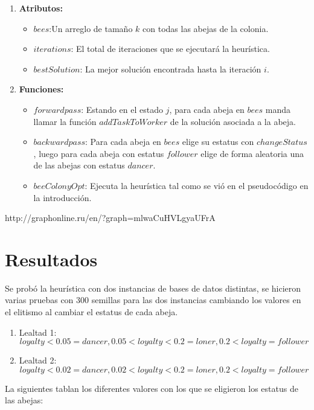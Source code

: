 \documentclass[12pt]{article}
\begin{document}
	\begin{enumerate}
		\item \textbf{Atributos:}
		\begin{itemize}
			\item $bees$:Un arreglo de tamaño $k$ con todas las abejas de la colonia.
			\item $iterations$: El total de iteraciones que se ejecutará la heurística.
			\item $bestSolution$: La mejor solución encontrada hasta la iteración $i$.
		\end{itemize}
		\item \textbf{Funciones:}
		\begin{itemize}
			\item $forwardpass$: Estando en el estado $j$, para cada abeja en $bees$ 
			manda llamar la función $addTaskToWorker$ de la solución asociada a la 
			abeja.
			\item $backwardpass$: Para cada abeja en $bees$ elige su estatus con 
			$changeStatus$, luego para cada abeja con estatus $follower$ elige de 
			forma aleatoria una de las abejas con estatus $dancer$.
			\item $beeColonyOpt$: Ejecuta la heurística tal como se vió en el 
			pseudocódigo en la introducción.  
		\end{itemize}
	\end{enumerate}

	http://graphonline.ru/en/?graph=mlwaCuHVLgyaUFrA
	
	\section{Resultados}
	
	Se probó la heurística con dos instancias de bases de datos distintas, se hicieron
	varias pruebas con 300 semillas para las dos instancias cambiando los valores en 
	el elitismo al cambiar el estatus de cada abeja.
	
	\begin{enumerate}
		\item Lealtad 1:
		\[loyalty < 0.05 = dancer,  0.05 < loyalty < 0.2 = loner,0.2<loyalty=follower\]
		\item Lealtad 2:
		\[loyalty < 0.02 = dancer,  0.02 < loyalty < 0.2 = loner,0.2<loyalty=follower\]
	\end{enumerate}
	
	La siguientes tablan los diferentes valores con los que se eligieron los estatus
	de las abejas:
	
\end{document}

